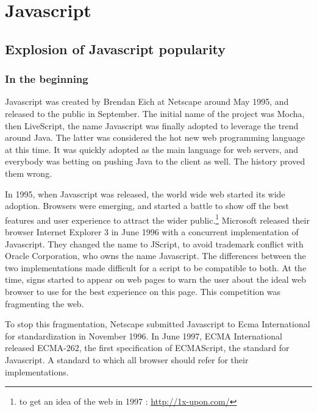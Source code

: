 \section{Javascript}

\subsection{Explosion of Javascript popularity}

\subsubsection{In the beginning}

Javascript was created by Brendan Eich at Netscape around May 1995, and released to the public in September.
The initial name of the project was Mocha, then LiveScript, the name Javascript was finally adopted to leverage the trend around Java.
The latter was considered the hot new web programming language at this time.
It was quickly adopted as the main language for web servers, and everybody was betting on pushing Java to the client as well.
The history proved them wrong.

In 1995, when Javascript was released, the world wide web started its wide adoption.
Browsers were emerging, and started a battle to show off the best features and user experience to attract the wider public.\footnote{to get an idea of the web in 1997 : \url{http://1x-upon.com/}}
Microsoft released their browser Internet Explorer 3 in June 1996 with a concurrent implementation of Javascript.
They changed the name to JScript, to avoid trademark conflict with Oracle Corporation, who owns the name Javascript.
The differences between the two implementations made difficult for a script to be compatible to both.
At the time, signs started to appear on web pages to warn the user about the ideal web browser to use for the best experience on this page.
This competition was fragmenting the web.

To stop this fragmentation, Netscape submitted Javascript to Ecma International for standardization in November 1996.
In June 1997, ECMA International released ECMA-262, the first specification of ECMAScript, the standard for Javascript.
A standard to which all browser should refer for their implementations.


